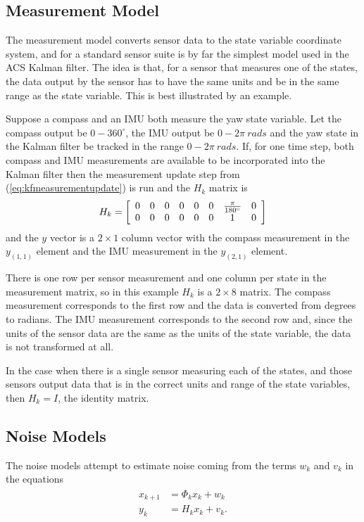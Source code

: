 \subsection{Measurement Model}
\label{sec:kfMeasurementModel}
The measurement model converts sensor data to the state variable coordinate system, and for a standard sensor suite is by far the simplest model used in the ACS Kalman filter. The idea is that, for a sensor that measures one of the states, the data output by the sensor has to have the same units and be in the same range as the state variable. This is best illustrated by an example.

Suppose a compass and an IMU both measure the yaw state variable. Let the compass output be $0 - 360^\circ$, the IMU output be $0 - 2\pi~rads$ and the yaw state in the Kalman filter be tracked in the range $0 - 2\pi ~ rads$. If, for one time step, both compass and IMU measurements are available to be incorporated into the Kalman filter then the measurement update step from (\ref{eq:kfmeasurementupdate}) is run and the $H_k$ matrix is
\begin{align*}
H_k = \left[\begin{array}{c c c c c c c c}
0 & 0 & 0 & 0 & 0 & 0 & \frac{\pi}{180^\circ} & 0 \\
0 & 0 & 0 & 0 & 0 & 0 & 1 & 0
\end{array}\right]
\end{align*}
and the $y$ vector is a $2\times1$ column vector with the compass measurement in the $y_{(1,1)}$ element and the IMU measurement in the $y_{(2,1)}$ element.

There is one row per sensor measurement and one column per state in the measurement matrix, so in this example $H_k$ is a $2\times8$ matrix. The compass measurement corresponds to the first row and the data is converted from degrees to radians. The IMU measurement corresponds to the second row and, since the units of the sensor data are the same as the units of the state variable, the data is not transformed at all.

In the case when there is a single sensor measuring each of the states, and those sensors output data that is in the correct units and range of the state variables, then $H_k=I$, the identity matrix.

\subsection{Noise Models}
\label{sec:kfNoiseModels}
The noise models attempt to estimate noise coming from the terms $w_k$ and $v_k$ in the equations
\begin{align*}
\begin{split}
x_{k+1} &= \Phi_kx_k + w_k \\
y_k &= H_kx_k + v_k.
\end{split}
\end{align*}

